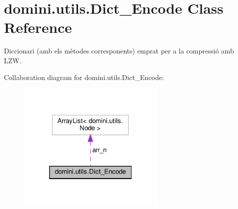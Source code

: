 \hypertarget{classdomini_1_1utils_1_1Dict__Encode}{}\section{domini.\+utils.\+Dict\+\_\+\+Encode Class Reference}
\label{classdomini_1_1utils_1_1Dict__Encode}


Diccionari (amb els mètodes corresponents) emprat per a la compressió amb L\+ZW.  




Collaboration diagram for domini.\+utils.\+Dict\+\_\+\+Encode\+:
\nopagebreak
\begin{figure}[H]
\begin{center}
\leavevmode
\includegraphics[width=205pt]{classdomini_1_1utils_1_1Dict__Encode__coll__graph}
\end{center}
\end{figure}

